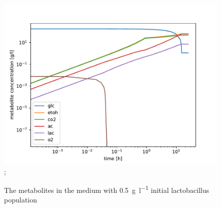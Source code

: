 		\begin{figure}[h]
			\includegraphics[width=\linewidth]{figures/results/cocultures/1_metabolites.pdf};
			\caption{The metabolites in the medium with \SI{0.5}{\gram\per\litre} initial lactobacillus population}
			\label{fig:cocult_1_met}
		\end{figure}
